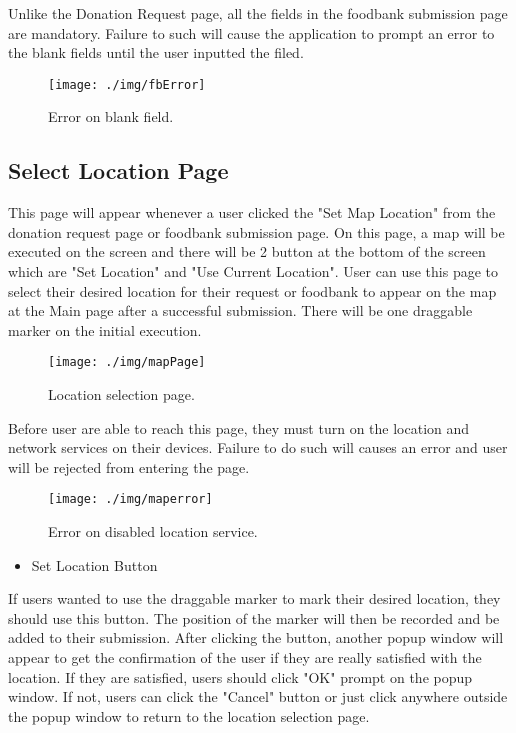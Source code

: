 \documentclass[conference]{IEEEtran}
\begin{document}
Unlike the Donation Request page, all the fields in the foodbank submission page are mandatory. Failure to such will cause the application to prompt an error to the blank fields until the user inputted the filed.

\begin{figure}[h!]
\texttt{[image: ./img/fbError]}
\centering
\caption{Error on blank field.}
\end{figure}

\subsection{Select Location Page}

This page will appear whenever a user clicked the "Set Map Location" from the donation request page or foodbank submission page. On this page, a map will be executed on the screen and there will be 2 button at the bottom of the screen which are "Set Location" and "Use Current Location". User can use this page to select their desired location for their request or foodbank to appear on the map at the Main page after a successful submission. There will be one draggable marker on the initial execution.

\begin{figure}[h!]
\texttt{[image: ./img/mapPage]}
\centering
\caption{Location selection page.}
\end{figure}

Before user are able to reach this page, they must turn on the location and network services on their devices. Failure to do such will causes an error and user will be rejected from entering the page.

\begin{figure}[h!]
\texttt{[image: ./img/maperror]}
\centering
\caption{Error on disabled location service.}
\end{figure}

\begin{itemize}
\item Set Location Button
\end{itemize}

If users wanted to use the draggable marker to mark their desired location, they should use this button. The position of the marker will then be recorded and be added to their submission. After clicking the button, another popup window will appear to get the confirmation of the user if they are really satisfied with the location. If they are satisfied, users should click "OK" prompt on the popup window. If not, users can click the "Cancel" button or just click anywhere outside the popup window to return to the location selection page.
\end{document}

